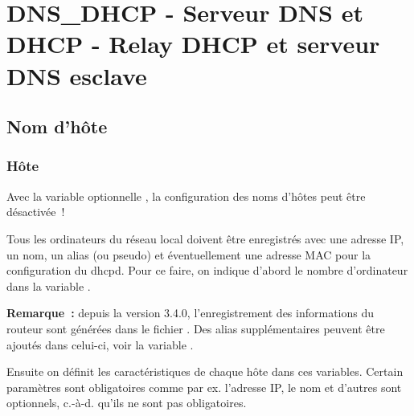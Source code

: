
{
\section{DNS\_DHCP - Serveur DNS et DHCP - Relay DHCP et serveur DNS esclave}
}

\subsection{Nom d'hôte}
\subsubsection{Hôte}
\begin{description}

    Avec la variable optionnelle , la configuration des noms
	d'hôtes peut être désactivée~!


      {Tous les ordinateurs du réseau local doivent être enregistrés
      avec une adresse IP, un nom, un alias (ou pseudo) et éventuellement
      une adresse MAC pour la configuration du dhcpd. Pour ce faire,
      on indique d'abord le nombre d'ordinateur dans la variable .

     \textbf{Remarque~:} depuis la version 3.4.0, l'enregistrement des
     informations du routeur sont générées dans le fichier .
     Des alias supplémentaires peuvent être ajoutés dans celui-ci, voir la
     variable .

      Ensuite on définit les caractéristiques de chaque hôte dans ces variables.
      Certain paramètres sont obligatoires comme par ex. l'adresse IP, le nom et
      d'autres sont optionnels, c.-à-d. qu'ils ne sont pas obligatoires.

}
\end{description}
